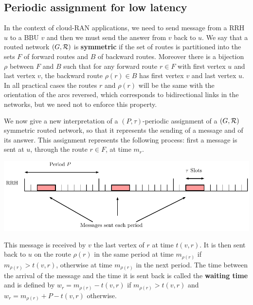 \documentclass[a4paper,10pt]{article}
\begin{document}
{      
      \subsection{Periodic assignment for low latency}
      In the context of cloud-RAN applications, we need to send message from a RRH $u$ to a BBU $v$ and then 
      we must send the answer from $v$ back to $u$. We say that a routed network $(G, {\cal R})$ is \textbf{symmetric} if the set of routes is partitioned into the sets $F$ of forward routes and $B$ of backward routes. Moreover there is a bijection $\rho$ between $F$ and $B$ such that for any forward route $r \in F$ with first vertex $u$ and last vertex $v$, the backward route $\rho(r) \in B$ has first vertex $v$ and last vertex $u$. In all practical cases the routes $r$ and $\rho(r)$ will be the same with the orientation of the arcs reversed, which corresponds to bidirectional links in the networks, but we need not to enforce this property.
         
         We now give a new interpretation of a $(P,\tau)$-periodic assignment of a $(G,{\cal R})$ symmetric routed network, so that it represents the sending of a message and of its answer.
	This assignment represents the following process: first a message is sent at $u$, through the route $r \in F$, at time $m_r$.
       
      
      
      \begin{center}
      \includegraphics[width=\textwidth]{rrh.pdf}
      \end{center}
      
      

      This message is received by $v$ the last vertex of $r$ at time $t(v,r)$. It is then sent back to $u$ on the route $\rho(r)$ in the same period at time $m_{\rho(r)}$ if $m_{\rho(r)} > t(v,r)$, otherwise at time $m_{\rho(r)}$ in the next period. The time between the arrival of the message and the time it is sent back is called the \textbf{waiting time} and is defined by $w_r = m_{\rho(r)} - t(v,r)$ if $m_{\rho(r)} > t(v,r)$ and $w_r = m_{\rho(r)} + P - t(v,r)$ otherwise.
 
}
\end{document}

